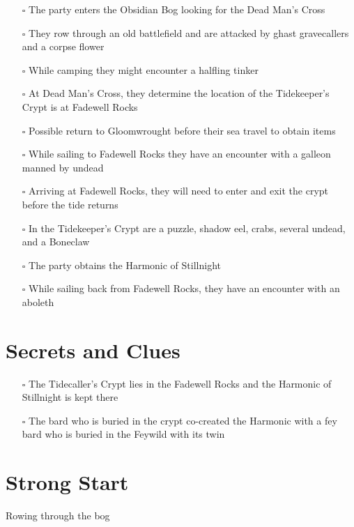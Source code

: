 \documentclass[10pt,twocolumn]{article}
\providecommand{\tightlist}{
  \setlength{\itemsep}{4pt}
  \setlength{\topsep}{0pt}
  \setlength{\parsep}{0pt}
  \setlength{\parskip}{0pt}
  \setlength{\partopsep}{0pt}
}
\begin{document}
\begin{itemize}
\tightlist
\item[$\square$]
  The party enters the Obsidian Bog looking for the Dead Man's Cross
\item[$\square$]
  They row through an old battlefield and are attacked by ghast
  gravecallers and a corpse flower
\item[$\square$]
  While camping they might encounter a halfling tinker
\item[$\square$]
  At Dead Man's Cross, they determine the location of the Tidekeeper's
  Crypt is at Fadewell Rocks
\item[$\square$]
  Possible return to Gloomwrought before their sea travel to obtain
  items
\item[$\square$]
  While sailing to Fadewell Rocks they have an encounter with a galleon
  manned by undead
\item[$\square$]
  Arriving at Fadewell Rocks, they will need to enter and exit the crypt
  before the tide returns
\item[$\square$]
  In the Tidekeeper's Crypt are a puzzle, shadow eel, crabs, several
  undead, and a Boneclaw
\item[$\square$]
  The party obtains the Harmonic of Stillnight
\item[$\square$]
  While sailing back from Fadewell Rocks, they have an encounter with an
  aboleth
\end{itemize}

\section{Secrets and Clues}\label{secrets-and-clues}

\begin{itemize}
\tightlist
\item[$\square$]
  The Tidecaller's Crypt lies in the Fadewell Rocks and the Harmonic of
  Stillnight is kept there
\item[$\square$]
  The bard who is buried in the crypt co-created the Harmonic with a fey
  bard who is buried in the Feywild with its twin
\end{itemize}

\section{Strong Start}\label{strong-start}

\begin{tcolorbox}[
  colback={imagecolor},
  coltext=black,
  colframe=black,
  boxrule=1pt,
  arc=6pt,
  left=4pt,
  right=4pt,
  top=2pt,
  bottom=2pt,
  boxsep=4pt,
  before skip=10pt,
  after skip=10pt,
  fontupper={\blockquoteFont\small\linespread{0.9}\selectfont\color{black}}
]

\faPhotoVideo\hspace{0.8em}\begin{minipage}[t]{\dimexpr\linewidth-1.8em\hangindent=1.8em\hangafter=0}Rowing
through the bog

\end{minipage}\end{tcolorbox}
\end{document}
